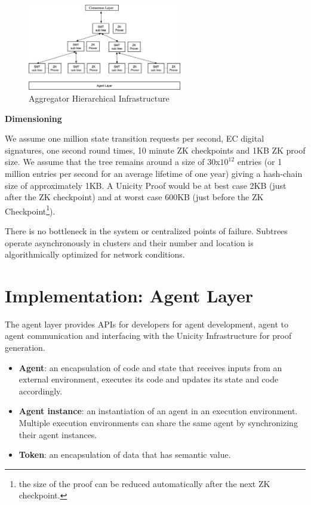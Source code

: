 \documentclass{article}
\begin{document}
\begin{figure}[htbp]
    \centering
    \includegraphics[width=0.6\textwidth]{SMT-Infra.png}
    \caption{Aggregator Hierarchical Infrastructure}
    \label{fig:SMT-Infra}
\end{figure}

\textbf{Dimensioning}
\vspace{2mm}

We assume one million state transition requests per second, EC digital signatures, one second round times, 10 minute ZK checkpoints and 1KB ZK proof size. We assume that the tree remains around a size of 30x$10^{12}$ entries (or 1 million entries per second for an average lifetime of one year) giving a hash-chain size of approximately 1KB.
A Unicity Proof would be at best case 2KB (just after the ZK checkpoint) and at worst case 600KB (just before the ZK Checkpoint\footnote{the size of the proof can be reduced automatically after the next ZK checkpoint.}). 

\vspace{2mm}

There is no bottleneck in the system or centralized points of failure. Subtrees operate asynchronously in clusters and their number and location is algorithmically optimized for network conditions.


\section{Implementation: Agent Layer}


The agent layer provides APIs for developers for agent development, agent to agent communication and interfacing with the Unicity Infrastructure for proof generation. 
\vspace{2mm}

\begin{itemize}
\setlength{\leftmargin}{1em}
\item \textbf{Agent}: an encapsulation of code and state that receives inputs from an external environment, executes its code and updates its state and code accordingly.
\item \textbf{Agent instance}: an instantiation of an agent in an execution environment. Multiple execution environments can share the same agent by synchronizing their agent instances. 
\item \textbf{Token}: an encapsulation of data that has semantic value.
 
\end{itemize}
\end{document}
